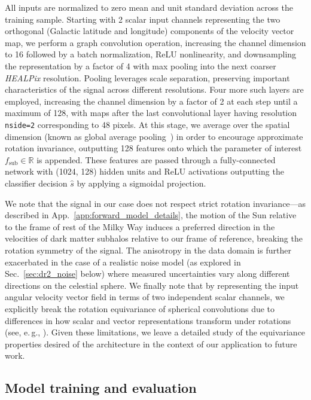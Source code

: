 \documentclass[twocolumn]{aastex631}
\newcommand{\package}[1]{\textsl{#1}\xspace}
\newcommand{\eg}{{e.\,g.}\xspace}
\newcommand{\healpix}{\package{HEALPix}}
\begin{document}
All inputs are normalized to zero mean and unit standard deviation across the training sample. Starting with 2 scalar input channels representing the two orthogonal (Galactic latitude and longitude) components of the velocity vector map, we perform a graph convolution operation, increasing the channel dimension to 16 followed by a batch normalization, ReLU nonlinearity, and downsampling the representation by a factor of 4 with max pooling into the next coarser \healpix resolution. Pooling leverages scale separation, preserving important characteristics of the signal across different resolutions. 
Four more such layers are employed, increasing the channel dimension by a factor of 2 at each step until a maximum of 128, with maps after the last convolutional layer having resolution \texttt{nside=2} corresponding to 48 pixels. At this stage, we average over the spatial dimension (known as global average pooling~\citep{lin2014network}) in order to encourage approximate rotation invariance, outputting 128 features onto which the parameter of interest {$f_\mathrm{sub}\in\mathbb R$} is appended. These features are passed through a fully-connected network with (1024, 128) hidden units and ReLU activations outputting the classifier decision $\hat s$ by applying a sigmoidal projection.

{We note that the signal in our case does not respect strict rotation invariance---as described in App.~\ref{app:forward_model_details}, the motion of the Sun relative to the frame of rest of the Milky Way induces a preferred direction in the velocities of dark matter subhalos relative to our frame of reference, breaking the rotation symmetry of the signal. The anisotropy in the data domain is further exacerbated in the case of a realistic noise model (as explored in Sec.~\ref{sec:dr2_noise} below) where measured uncertainties vary along different directions on the celestial sphere. We finally note that by representing the input angular velocity vector field in terms of two independent scalar channels, we explicitly break the rotation equivariance of spherical convolutions due to differences in how scalar and vector representations transform under rotations (see, \eg, \citet{DBLP:conf/nips/EstevesMD20}). Given these limitations, we leave a detailed study of the equivariance properties desired of the architecture in the context of our application to future work.}

\subsection{Model training and evaluation} 
\label{sec:training}
\end{document}
